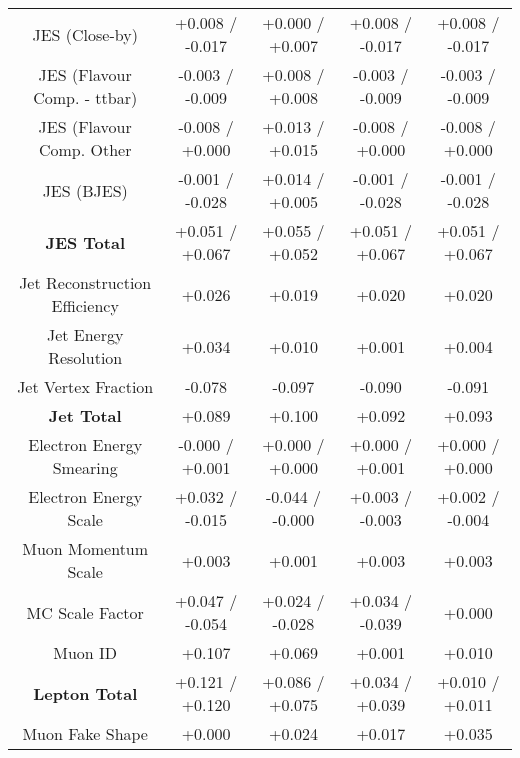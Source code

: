 \begin{table}[htbp]
\begin{center}
\begin{tabular}{|c|c|c|c|c|}
JES (Close-by)                        &+0.008   / -0.017   & +0.000   / +0.007   & +0.008   / -0.017   & +0.008   / -0.017  \\
JES (Flavour Comp. - ttbar)           &-0.003   / -0.009   & +0.008   / +0.008   & -0.003   / -0.009   & -0.003   / -0.009  \\
JES (Flavour Comp. Other              &-0.008   / +0.000   & +0.013   / +0.015   & -0.008   / +0.000   & -0.008   / +0.000  \\
JES (BJES)                            &-0.001   / -0.028   & +0.014   / +0.005   & -0.001   / -0.028   & -0.001   / -0.028  \\
\hline
\textbf{JES Total}                    &+0.051   / +0.067   & +0.055   / +0.052   & +0.051   / +0.067   & +0.051   / +0.067  \\
\hline
Jet Reconstruction Efficiency         &+0.026              & +0.019              & +0.020              & +0.020             \\
Jet Energy Resolution                 &+0.034              & +0.010              & +0.001              & +0.004             \\
Jet Vertex Fraction                   &-0.078              & -0.097              & -0.090              & -0.091             \\
\hline
\textbf{Jet Total}                    &+0.089              & +0.100              & +0.092              & +0.093             \\
\hline
Electron Energy Smearing              &-0.000   / +0.001   & +0.000   / +0.000   & +0.000   / +0.001   & +0.000   / +0.000  \\
Electron Energy Scale                 &+0.032   / -0.015   & -0.044   / -0.000   & +0.003   / -0.003   & +0.002   / -0.004  \\
Muon Momentum Scale                   &+0.003              & +0.001              & +0.003              & +0.003             \\
MC Scale Factor                       &+0.047   / -0.054   & +0.024   / -0.028   & +0.034   / -0.039   & +0.000             \\
Muon ID                               &+0.107              & +0.069              & +0.001              & +0.010             \\
\hline
\textbf{Lepton Total}                 &+0.121   / +0.120   & +0.086   / +0.075   & +0.034   / +0.039   & +0.010   / +0.011  \\
\hline
Muon Fake Shape                       &+0.000              & +0.024              & +0.017              & +0.035             \\

\end{tabular}
\end{center}
\end{table}
